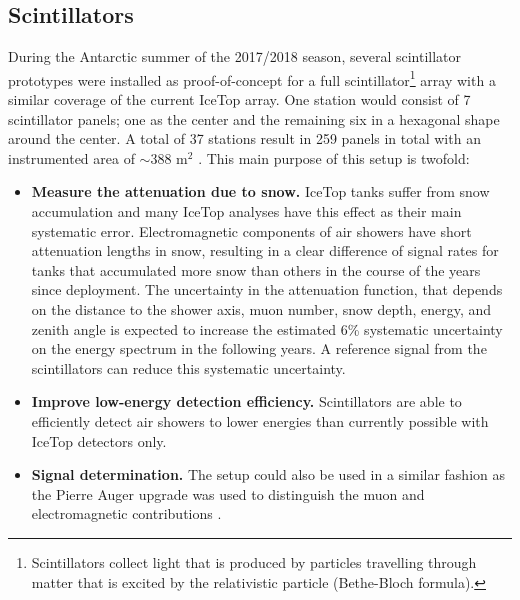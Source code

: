 \subsection{Scintillators}
During the Antarctic summer of the 2017/2018 season, several scintillator prototypes were installed as proof-of-concept for a full scintillator\footnote{Scintillators collect light that is produced by particles travelling through matter that is excited by the relativistic particle (Bethe-Bloch formula).} array with a similar coverage of the current IceTop array. One station would consist of 7 scintillator panels; one as the center and the remaining six in a hexagonal shape around the center. A total of 37 stations result in 259 panels in total with an instrumented area of $\sim 388$ m$^2$ \cite{Collaboration:2017tdy}. This main purpose of this setup is twofold:
\\
\begin{itemize}
\item \textbf{Measure the attenuation due to snow.} IceTop tanks suffer from snow accumulation and many IceTop analyses have this effect as their main systematic error. Electromagnetic components of air showers have short attenuation lengths in snow, resulting in a clear difference of signal rates for tanks that accumulated more snow than others in the course of the years since deployment. The uncertainty in the attenuation function, that depends on the distance to the shower axis, muon number, snow depth, energy, and zenith angle is expected to increase the estimated 6\% systematic uncertainty on the energy spectrum in the following years. A reference signal from the scintillators can reduce this systematic uncertainty.
\item \textbf{Improve low-energy detection efficiency.} Scintillators are able to efficiently detect air showers to lower energies than currently possible with IceTop detectors only.
\item \textbf{Signal determination.} The setup could also be used in a similar fashion as the Pierre Auger upgrade was used to distinguish the muon and electromagnetic contributions \cite{Aab:2016vlz}. 
\end{itemize}
 
